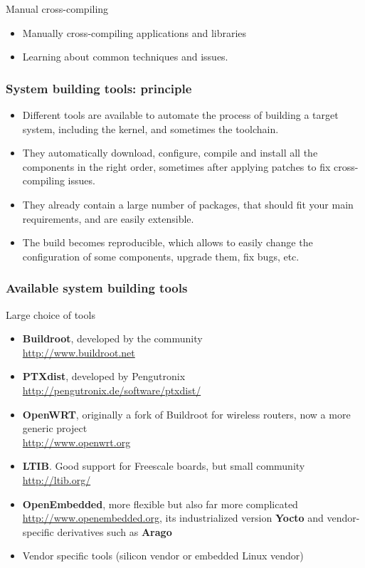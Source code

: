 \setuplabframe
{Manual cross-compiling}
{
  \begin{itemize}
  \item Manually cross-compiling applications and libraries
  \item Learning about common techniques and issues.
  \end{itemize}
}

\begin{frame}
  \frametitle{System building tools: principle}
  \begin{itemize}
  \item Different tools are available to automate the process of
    building a target system, including the kernel, and sometimes the
    toolchain.
  \item They automatically download, configure, compile and install
    all the components in the right order, sometimes after applying
    patches to fix cross-compiling issues.
  \item They already contain a large number of packages, that should
    fit your main requirements, and are easily extensible.
  \item The build becomes reproducible, which allows to easily change
    the configuration of some components, upgrade them, fix bugs, etc.
  \end{itemize}
\end{frame}

\begin{frame}
  \frametitle{Available system building tools} Large choice of tools
  \small
  \begin{itemize}
  \item {\bf Buildroot}, developed by the community\\
    \url{http://www.buildroot.net}
  \item {\bf PTXdist}, developed by Pengutronix\\
    \url{http://pengutronix.de/software/ptxdist/}
  \item {\bf OpenWRT}, originally a fork of Buildroot for wireless routers,
    now a more generic project\\
    \url{http://www.openwrt.org}
  \item {\bf LTIB}. Good support for Freescale boards, but small community\\
    \url{http://ltib.org/}
  \item {\bf OpenEmbedded}, more flexible but also far more complicated\\
    \url{http://www.openembedded.org}, its industrialized version {\bf
      Yocto} and vendor-specific derivatives such as {\bf Arago}
  \item Vendor specific tools (silicon vendor or embedded Linux
    vendor)
  \end{itemize}
\end{frame}

